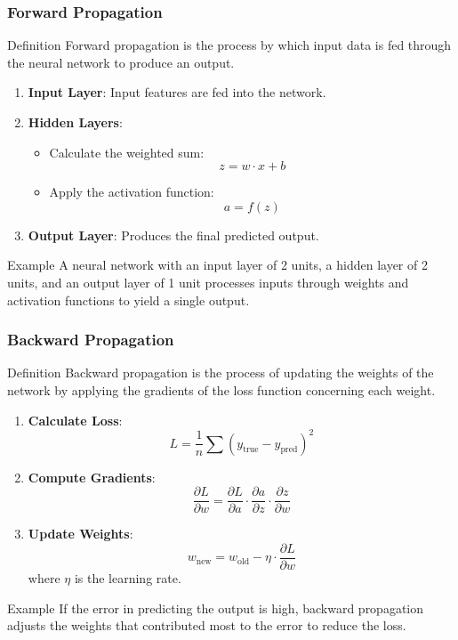 \documentclass[aspectratio=169]{beamer}
\begin{document}
\begin{frame}[fragile]
  \frametitle{Forward Propagation}
  \begin{block}{Definition}
    Forward propagation is the process by which input data is fed through the neural network to produce an output.
  \end{block}
  
  \begin{enumerate}
    \item \textbf{Input Layer}: Input features are fed into the network.
    \item \textbf{Hidden Layers}:
      \begin{itemize}
        \item Calculate the weighted sum:
          \[
          z = w \cdot x + b
          \]
        \item Apply the activation function:
          \[
          a = f(z)
          \]
      \end{itemize}
    \item \textbf{Output Layer}: Produces the final predicted output.
  \end{enumerate}
  
  \begin{block}{Example}
    A neural network with an input layer of 2 units, a hidden layer of 2 units, and an output layer of 1 unit processes inputs through weights and activation functions to yield a single output.
  \end{block}
\end{frame}

\begin{frame}[fragile]
  \frametitle{Backward Propagation}
  \begin{block}{Definition}
    Backward propagation is the process of updating the weights of the network by applying the gradients of the loss function concerning each weight.
  \end{block}
  
  \begin{enumerate}
    \item \textbf{Calculate Loss}:
      \[
      L = \frac{1}{n} \sum (y_{\text{true}} - y_{\text{pred}})^2
      \]
    \item \textbf{Compute Gradients}:
      \[
      \frac{\partial L}{\partial w} = \frac{\partial L}{\partial a} \cdot \frac{\partial a}{\partial z} \cdot \frac{\partial z}{\partial w}
      \]
    \item \textbf{Update Weights}:
      \[
      w_{\text{new}} = w_{\text{old}} - \eta \cdot \frac{\partial L}{\partial w}
      \]
      where \( \eta \) is the learning rate.
  \end{enumerate}
  
  \begin{block}{Example}
    If the error in predicting the output is high, backward propagation adjusts the weights that contributed most to the error to reduce the loss.
  \end{block}
\end{frame}
\end{document}
